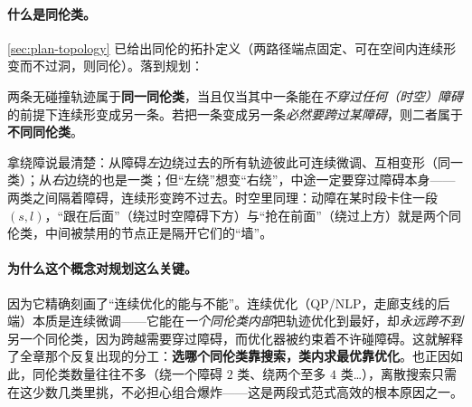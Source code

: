 \paragraph{什么是同伦类。}
\cref{sec:plan-topology} 已给出同伦的拓扑定义（两路径端点固定、可在空间内连续形变而不过洞，则同伦）。落到规划：
\begin{definition}[规划中的同伦类]\label{def:stc-homotopy}
两条无碰撞轨迹属于\textbf{同一同伦类}，当且仅当其中一条能在\emph{不穿过任何（时空）障碍}的前提下连续形变成另一条。若把一条变成另一条\emph{必然要跨过某障碍}，则二者属于\textbf{不同同伦类}。
\end{definition}
\noindent 拿绕障说最清楚：从障碍\emph{左}边绕过去的所有轨迹彼此可连续微调、互相变形（同一类）；从\emph{右}边绕的也是一类；但“左绕”想变“右绕”，中途一定要穿过障碍本身——两类之间隔着障碍，连续形变跨不过去。时空里同理：动障在某时段卡住一段 $(s,l)$，“跟在后面”（绕过时空障碍下方）与“抢在前面”（绕过上方）就是两个同伦类，中间被禁用的节点正是隔开它们的“墙”。

\paragraph{为什么这个概念对规划这么关键。}
因为它精确刻画了“连续优化的能与不能”。连续优化（QP/NLP，走廊支线的后端）本质是连续微调——它能在\emph{一个同伦类内部}把轨迹优化到最好，却\emph{永远跨不到}另一个同伦类，因为跨越需要穿过障碍，而优化器被约束着不许碰障碍。这就解释了全章那个反复出现的分工：\textbf{选哪个同伦类靠搜索，类内求最优靠优化}。也正因如此，同伦类数量往往不多（绕一个障碍 $2$ 类、绕两个至多 $4$ 类\dots），离散搜索只需在这少数几类里挑，不必担心组合爆炸——这是两段式范式高效的根本原因之一。

